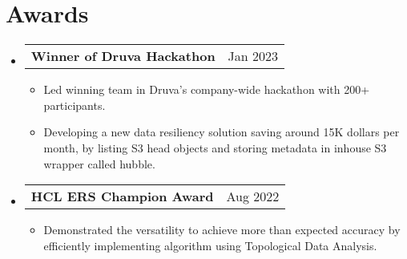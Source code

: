 \documentclass[letterpaper,11pt]{article}
\makeatletter
\newcommand{\resumeItem}[1]{
  \item\small{
    {#1 \vspace{-2pt}}
  }
}
\newcommand{\resumeProjectHeading}[2]{
    \item
    \begin{tabular*}{0.97\textwidth}{l@{\extracolsep{\fill}}r}
      \small#1 & #2 \\
    \end{tabular*}\vspace{-8pt}
}
\newcommand{\resumeSubHeadingListStart}{\begin{itemize}[leftmargin=0.1in, label={}]\vspace{-3pt}}
\newcommand{\resumeSubHeadingListEnd}{\end{itemize}}
\newcommand{\resumeItemListStart}{\begin{itemize}}
\newcommand{\resumeItemListEnd}{\end{itemize}\vspace{-8pt}}
\makeatother
\begin{document}
\section{Awards}
    \resumeSubHeadingListStart
      \resumeProjectHeading
        {\textbf{Winner of Druva Hackathon}}{Jan 2023}
          \resumeItemListStart
            \resumeItem{Led winning team in Druva’s company-wide hackathon with 200+ participants.}
            \resumeItem{Developing a new
data resiliency solution saving around 15K dollars per month, by listing S3 head objects and storing metadata in inhouse S3 wrapper called hubble.}
            \resumeItemListEnd
      \resumeProjectHeading
          {\textbf{HCL ERS Champion Award}}{Aug 2022}
          \resumeItemListStart
            \resumeItem{Demonstrated the versatility to achieve more than expected accuracy by efficiently implementing algorithm using Topological Data Analysis.}
          \resumeItemListEnd
    \resumeSubHeadingListEnd
%





\end{document}
